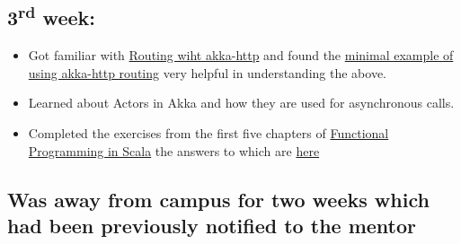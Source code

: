 \documentclass{article}
\begin{document}
    
\subsection*{3\textsuperscript{rd} week:}
\begin{itemize}
 \item Got familiar with \href{http://doc.akka.io/docs/akka-http/current/scala/http/routing-dsl/index.html}{Routing wiht akka-http} and found the 
\href{http://doc.akka.io/docs/akka-http/current/scala/http/routing-dsl/index.html#minimal-example}{minimal example of using akka-http routing} very helpful in understanding the above.

  \item Learned about Actors in Akka and how they are used for asynchronous calls.


 \item Completed the exercises from the first five chapters of \href{https://www.manning.com/books/functional-programming-in-scala}{Functional Programming in Scala} the answers to which are \href{https://github.com/SnehalRaj/Programmers_den/tree/master/documentation}{here} 

\end{itemize}

\subsection*{Was away from campus for two weeks which had been previously notified to the mentor}
\end{document}
